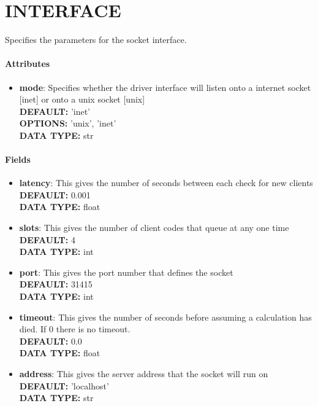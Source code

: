 \section{INTERFACE}
\label{INTERFACE}
Specifies the parameters for the socket interface.
\paragraph{Attributes}
 \begin{itemize}
\item {\bf mode}:
 Specifies whether the driver interface will listen onto a internet socket [inet] or onto a unix socket [unix]
{\\ \bf DEFAULT: }'inet'
{\\ \bf OPTIONS: }'unix', 'inet'
{\\ \bf DATA TYPE: }str
\end{itemize}
 
\paragraph{Fields}
 \begin{itemize}
\item {\bf latency}:
 This gives the number of seconds between each check for new clients
{\\ \bf DEFAULT: }0.001
{\\ \bf DATA TYPE: }float
\item {\bf slots}:
 This gives the number of client codes that queue at any one time
{\\ \bf DEFAULT: }4
{\\ \bf DATA TYPE: }int
\item {\bf port}:
 This gives the port number that defines the socket
{\\ \bf DEFAULT: }31415
{\\ \bf DATA TYPE: }int
\item {\bf timeout}:
 This gives the number of seconds before assuming a calculation has died. If 0 there is no timeout.
{\\ \bf DEFAULT: }0.0
{\\ \bf DATA TYPE: }float
\item {\bf address}:
 This gives the server address that the socket will run on
{\\ \bf DEFAULT: }'localhost'
{\\ \bf DATA TYPE: }str
\end{itemize}
 
